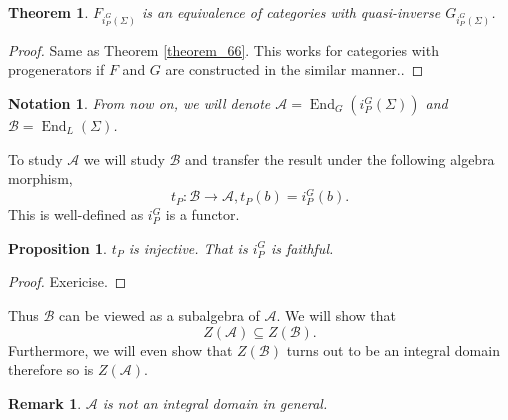 \documentclass[8pt]{article}
\newtheorem{theorem}{Theorem} [section]
\newtheorem{proposition}{Proposition}[section]
\newtheorem{notation}{Notation}[section]
\newtheorem{remark}{Remark}[section]
\DeclareMathOperator{\End}{End}
\newcommand{\cA}{\mathcal{A}}
\newcommand{\cB}{\mathcal{B}}
\begin{document}
  \begin{theorem}
    \label{theorem_100}
    $F_{i_P^G(\Sigma)}$ is an equivalence of categories with quasi-inverse $G_{i_P^G(\Sigma)}$.
  \end{theorem}
  \begin{proof}
    Same as Theorem \ref{theorem_66}. This works for categories with progenerators if $F$ and $G$ are constructed in the similar manner..
  \end{proof}
  \begin{notation}
    From now on, we will denote $\mathcal{A}=\End_G(i_P^G(\Sigma))$ and $\mathcal{B} = \End_L(\Sigma)$.
  \end{notation}
  To study $\mathcal{A}$ we will study $\mathcal{B}$ and transfer the result under the following algebra morphism,
  \begin{equation*}
    t_P:\mathcal{B}\to\mathcal{A}, t_P(b) = i_P^G(b).
  \end{equation*}
  This is well-defined as $i_P^G$ is a functor.
  \begin{proposition}
    $t_P$ is injective. That is $i_P^G$ is faithful.
  \end{proposition}
  \begin{proof}
    Exericise.
  \end{proof}
  Thus $\mathcal{B}$ can be viewed as a subalgebra of $\mathcal{A}$.
  We will show that 
  \begin{equation*}
    Z(\cA)\subseteq Z(\cB).
  \end{equation*}
  Furthermore, we will even show that $Z(\cB)$ turns out to be an integral domain therefore so is $Z(\cA)$.
  \begin{remark}
    $\cA$ is not an integral domain in general.
  \end{remark}
\end{document}
